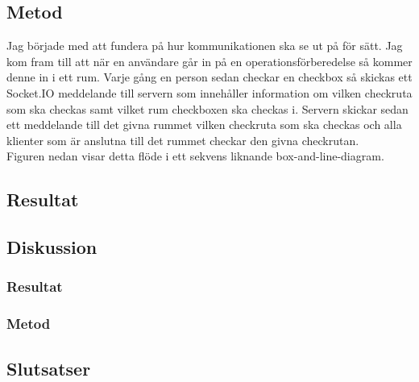 \subsection{Metod}
Jag började med att fundera på hur kommunikationen ska se ut på för sätt. Jag kom fram till att när en användare går in på en operationsförberedelse så kommer denne in i ett rum. Varje gång en person sedan checkar en checkbox så skickas ett Socket.IO meddelande till servern som innehåller information om vilken checkruta som ska checkas samt vilket rum checkboxen ska checkas i. Servern skickar sedan ett meddelande till det givna rummet vilken checkruta som ska checkas och alla klienter som är anslutna till det rummet checkar den givna checkrutan. \\

Figuren nedan visar detta flöde i ett sekvens liknande box-and-line-diagram.


\subsection{Resultat}
\subsection{Diskussion}
\subsubsection{Resultat}
\subsubsection{Metod}
\subsection{Slutsatser}
